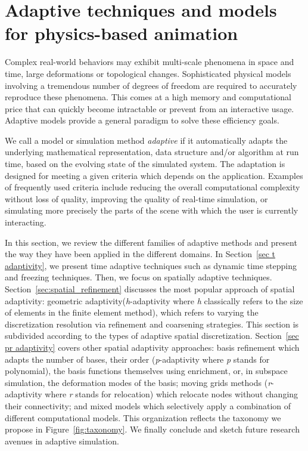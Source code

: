\section[Adaptive physics-based animation]{Adaptive techniques and models for physics-based animation}
\label{sec:starAdaptivity}
Complex real-world behaviors may exhibit multi-scale phenomena in space and time, large deformations or topological changes.
Sophisticated physical models involving a tremendous number of degrees of freedom are required to accurately reproduce these phenomena.
This comes at a high memory and computational price that can quickly become intractable or prevent from an interactive usage.
Adaptive models provide a general paradigm to solve these efficiency goals.

We call a model or simulation method \emph{adaptive} if it automatically adapts the underlying mathematical representation, data structure and/or algorithm at run time, based on the evolving state of the simulated system.
The adaptation is designed for meeting a given criteria which depends on the application. 
Examples of frequently used criteria include reducing the overall computational complexity without loss of quality, improving the quality of real-time simulation, or simulating more precisely the parts of the scene with which the user is currently interacting.

In this section, we review the different families of adaptive methods and present the way they have been applied in the different domains. In Section~\ref{sec t adaptivity}, we present time adaptive techniques such as dynamic time stepping and freezing techniques.
Then, we focus on spatially adaptive techniques.
Section~\ref{sec:spatial_refinement} discusses the most popular approach of spatial adaptivity: geometric adaptivity(\textit{h}-adaptivity where \textit{h} classically refers to the size of elements in the finite element method), which refers to varying the discretization resolution via refinement and coarsening strategies. This section is subdivided according to the types of adaptive spatial discretization.
Section~\ref{sec pr adaptivity} covers other spatial adaptivity approaches: basis refinement which adapts the number of bases, their order (\textit{p}-adaptivity where \textit{p} stands for polynomial), the basis functions themselves using enrichment, or, in subspace simulation, the deformation modes of the basis; moving grids methods (\textit{r}-adaptivity where \textit{r} stands for relocation) which relocate nodes without changing their connectivity; and mixed models which selectively apply a combination of different computational models. This organization reflects the taxonomy we propose in Figure~\ref{fig:taxonomy}.
We finally conclude and sketch future research avenues in adaptive simulation.
